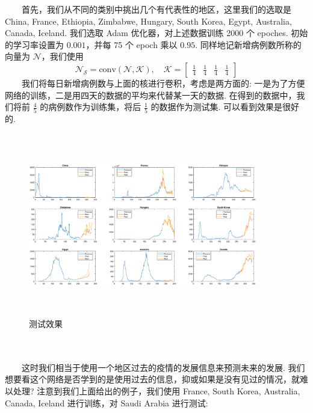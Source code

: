 \documentclass[a4paper, titlepage]{article}
\begin{document}
    　　首先，我们从不同的类别中挑出几个有代表性的地区，这里我们的选取是 China, France, Ethiopia, Zimbabwe, Hungary, South Korea, Egypt, Australia, Canada, Iceland. 我们选取 Adam 优化器，对上述数据训练 2000 个 epoches. 初始的学习率设置为 $0.001$，并每 75 个 epoch 乘以 $0.95$. 同样地记新增病例数所称的向量为 $\mathcal{N}$，我们使用
	\[
		\mathcal{N}_{\mathcal{S}} = \text{conv}(\mathcal{N},\mathcal{K}), \quad \mathcal{K} = \begin{bmatrix}
			\displaystyle\frac{1}{4}&\displaystyle\frac{1}{4}&\displaystyle\frac{1}{4}&\displaystyle\frac{1}{4}
	\end{bmatrix}
	\]
	　　我们将每日新增病例数与上面的核进行卷积，考虑是两方面的: 一是为了方便网络的训练，二是用四天的数据的平均来代替某一天的数据.
	在得到的数据中，我们将前 $\frac{4}{5}$ 的病例数作为训练集，将后 $\frac{1}{5}$ 的数据作为测试集. 可以看到效果是很好的.\\
    \vspace{-1em}
    \begin{minipage}{\textwidth}
        \begin{figure}[H]
            \centering
	        \includegraphics[height=8cm, width=10cm]{./Chap4/Pred.eps}
            \vspace{-1.5em}
            \caption{测试效果}
	\end{figure}
    \end{minipage}\\\quad\\
	　　这时我们相当于使用一个地区过去的疫情的发展信息来预测未来的发展. 我们想要看这个网络是否学到的是使用过去的信息，抑或如果是没有见过的情况，就难以处理? 注意到我们上面给出的例子，我们使用 France, South Korea, Australia, Canada, Iceland 进行训练，对 Saudi Arabia 进行测试:\\
    \vspace{-1em}
\end{document}
